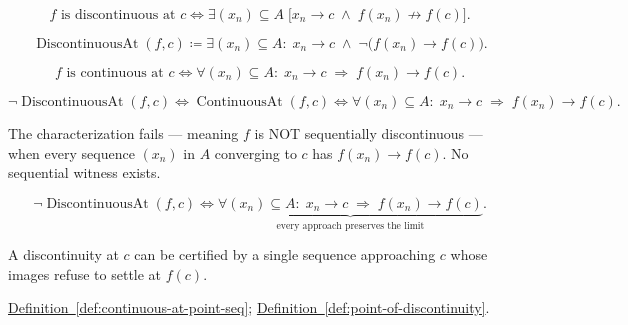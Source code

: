 \begin{remark*}
\[
f \text{ is discontinuous at } c \Longleftrightarrow
\exists (x_n)\subseteq A \;\bigl[x_n \to c \;\land\; f(x_n) \not\to f(c)\bigr].
\]
\end{remark*}

\begin{remark*}
\[
\operatorname{DiscontinuousAt}(f,c) \coloneqq \exists (x_n)\subseteq A:\; x_n\to c \;\land\; \neg\bigl(f(x_n)\to f(c)\bigr).
\]
\end{remark*}

\begin{remark*}
\[
f \text{ is continuous at } c \Longleftrightarrow
\forall (x_n)\subseteq A:\; x_n\to c \;\Rightarrow\; f(x_n)\to f(c).
\]
\end{remark*}

\begin{remark*}
\[
\neg \operatorname{DiscontinuousAt}(f,c)
\Longleftrightarrow
\operatorname{ContinuousAt}(f,c)
\Longleftrightarrow
\forall (x_n)\subseteq A:\; x_n\to c \;\Rightarrow\; f(x_n)\to f(c).
\]
\end{remark*}

\begin{remark*}
The characterization fails --- meaning $f$ is NOT sequentially discontinuous --- when every sequence $(x_n)$ in $A$ converging to $c$ has $f(x_n) \to f(c)$. No sequential witness exists.
\end{remark*}

\begin{remark*}
\[
\neg \operatorname{DiscontinuousAt}(f,c)
\Longleftrightarrow
\underbrace{\forall (x_n)\subseteq A:\;
  x_n\to c \;\Rightarrow\; f(x_n)\to f(c)
}_{\text{every approach preserves the limit}}.
\]
\end{remark*}

\begin{remark*}[Interpretation]
A discontinuity at $c$ can be certified by a single sequence approaching $c$ whose images refuse to settle at $f(c)$.
\end{remark*}

\begin{remark*}[Dependencies]
\hyperref[def:continuous-at-point-seq]{Definition~\ref{def:continuous-at-point-seq}}; \hyperref[def:point-of-discontinuity]{Definition~\ref{def:point-of-discontinuity}}.
\end{remark*}

